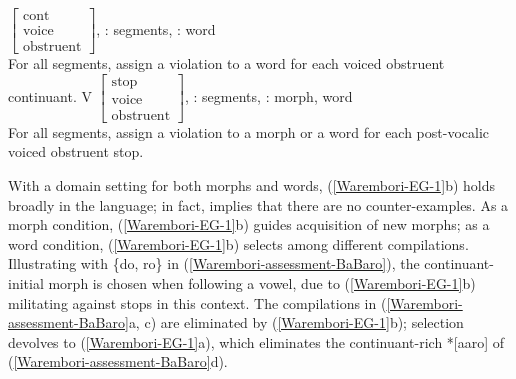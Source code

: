 \begin{example}  \label{Warembori-EG-1} 
\ea *$\begin{bmatrix}\textrm{cont}\\\textrm{voice}\\\textrm{obstruent}\end{bmatrix}$, \tier: segments, \dom: word\smallskip\\
For all segments, assign a violation to a word for each voiced obstruent continuant.
\ex *V $\begin{bmatrix}\textrm{stop}\\\textrm{voice}\\\textrm{obstruent}\end{bmatrix}$, \tier: segments, \dom: morph, word\smallskip\\
For all segments, assign a violation to a morph or a word for each post-vocalic voiced obstruent stop.
\z
\end{example}


With a domain setting for both morphs and words, (\ref{Warembori-EG-1}b) holds broadly in the language; in fact, \citet{Donohue:1999} implies that there are no counter-examples. As a morph condition,  (\ref{Warembori-EG-1}b) guides acquisition of new morphs; as a word condition, (\ref{Warembori-EG-1}b)  selects among different compilations. Illustrating with \{do, ro\} in (\ref{Warembori-assessment-BaBaro}), the continuant-initial morph is chosen when following a vowel, due to (\ref{Warembori-EG-1}b) militating against stops in this context. The compilations in (\ref{Warembori-assessment-BaBaro}a, c) are eliminated by (\ref{Warembori-EG-1}b); selection devolves to (\ref{Warembori-EG-1}a), which eliminates the continuant-rich *[\B a\B aro] of (\ref{Warembori-assessment-BaBaro}d).


